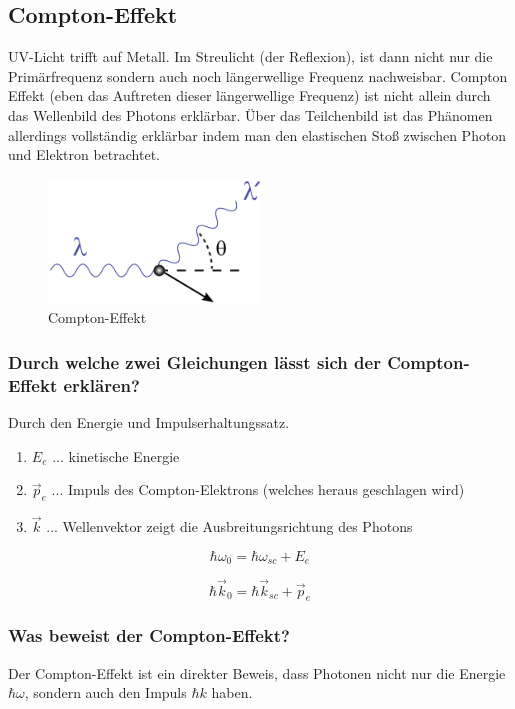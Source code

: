 \documentclass{article}
\begin{document}
\subsection{Compton-Effekt }\label{k1:comptonEf}
UV-Licht trifft auf Metall. Im Streulicht (der Reflexion), ist dann nicht nur die Primärfrequenz sondern auch noch längerwellige Frequenz nachweisbar.   
Compton Effekt (eben das Auftreten dieser längerwellige Frequenz) ist nicht allein durch das Wellenbild des Photons erklärbar.
Über das Teilchenbild ist das Phänomen allerdings vollständig erklärbar indem man den elastischen Stoß zwischen Photon und Elektron betrachtet.

\begin{figure}[H]
    \centering
    \includegraphics[width=0.5\textwidth]{fig/compton}
    \caption{Compton-Effekt}
    \label{fig:comptonEffect}
\end{figure}

\subsubsection{Durch welche zwei Gleichungen lässt sich der Compton-Effekt erklären?}
Durch den Energie und Impulserhaltungssatz. 

\begin{enumerate}
    \item $E_e$ ... kinetische Energie
    \item $\vec{p}_e$ ... Impuls des Compton-Elektrons (welches heraus geschlagen wird)
    \item $\vec{k}$ ... Wellenvektor zeigt die Ausbreitungsrichtung des Photons
\end{enumerate}
\begin{equation}
    \hbar \omega_0 = \hbar \omega_{sc} + E_e
\end{equation}

\begin{equation}
    \hbar \vec{k}_0 = \hbar \vec{k}_{sc} + \vec{p}_e
\end{equation}

\subsubsection{Was beweist der Compton-Effekt?}
Der Compton-Effekt ist ein direkter Beweis, dass Photonen nicht nur die Energie $\hbar \omega$, sondern auch den Impuls $\hbar k$ haben.
\end{document}
